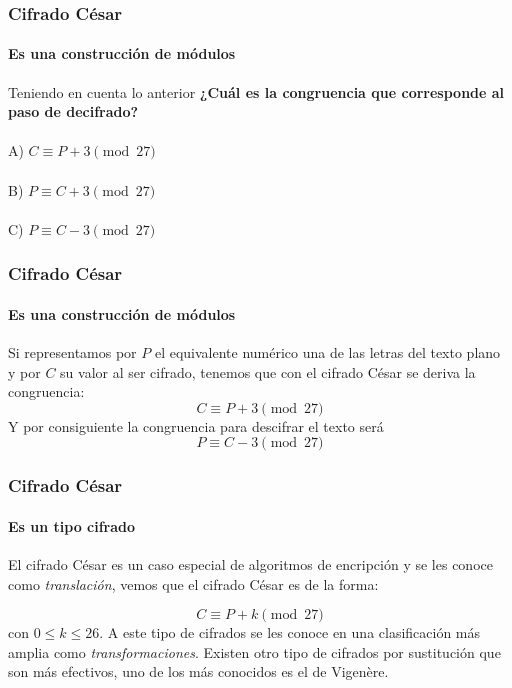 \documentclass[spanish, mexico]{beamer}
\begin{document}
		\begin{frame}
		\frametitle{Cifrado César}
		\framesubtitle{Es una construcción de módulos}
		Teniendo en cuenta lo anterior \textbf{¿Cuál es la congruencia que corresponde al paso de decifrado?}\\~\\
		A) $C \equiv P + 3 \pmod{27}$\\~\\
		B) $P \equiv C + 3 \pmod{27}$\\~\\
		C) $P \equiv C - 3 \pmod{27}$
	\end{frame}

	\begin{frame}
		\frametitle{Cifrado César}
		\framesubtitle{Es una construcción de módulos}
		\begin{table}[]
			\centering
		\end{table}
		Si representamos por $P$ el equivalente numérico una de las letras del texto plano y por $C$ su valor al ser cifrado, tenemos que con el cifrado César se deriva la congruencia:
		$$C \equiv P + 3 \pmod{27}$$
		Y por consiguiente la congruencia para descifrar el texto será
		$$P \equiv C - 3 \pmod{27}$$ 
	\end{frame}

	\begin{frame}
		\frametitle{Cifrado César}
		\framesubtitle{Es un tipo cifrado}
		El cifrado César es un caso especial de algoritmos de encripción y se les conoce como \textit{translación}, vemos que el cifrado César es de la forma:
		
		$$C \equiv P + k \pmod{27}$$
		con $0 \leq k \leq 26$. A este tipo de cifrados se les conoce en una clasificación más amplia como \textit{transformaciones}. Existen otro tipo de cifrados por sustitución que son más efectivos, uno de los más conocidos es el de Vigenère.
	\end{frame}
\end{document}
